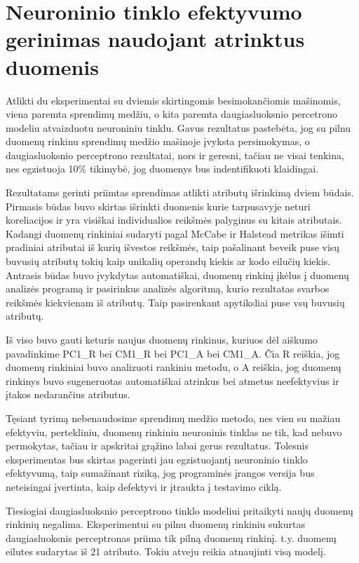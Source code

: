 \documentclass{VUMIFPSbakalaurinis}
\begin{document}
\section{Neuroninio tinklo efektyvumo gerinimas naudojant atrinktus duomenis}

Atlikti du eksperimentai su dviemis skirtingomis besimokančiomis mašinomis, viena paremta sprendimų medžiu, o kita paremta daugiasluoksnio percetrono modeliu atvaizduotu neuroniniu tinklu. Gavus rezultatus pastebėta, jog su pilnu duomenų rinkinu sprendimų medžio mašinoje įvyksta persimokymas, o daugiasluoksnio perceptrono rezultatai, nors ir geresni, tačiau ne visai tenkina, nes egzistuoja 10\% tikimybė, jog duomenys bus indentifikuoti klaidingai.

Rezultatams gerinti priimtas sprendimas atlikti atributų išrinkimą dviem būdais. Pirmasis būdas buvo skirtas išrinkti duomenis kurie tarpusavyje neturi koreliacijos ir yra visiškai individualios reikšmės palyginus su kitais atributais. Kadangi duomenų rinkiniai sudaryti pagal McCabe ir Halstead metrikas išimti pradiniai atributai iš kurių išvestos reikšmės, taip pašalinant beveik puse visų buvusių atributų tokių kaip unikalių operandų kiekis ar kodo eilučių kiekis. Antrasis būdas buvo įvykdytas automatiškai, duomenų rinkinį įkėlus į duomenų analizės programą ir pasirinkus analizės algoritmą, kurio rezultatas svarbos reikšmės kiekvienam iš atributų. Taip pasirenkant apytiksliai puse vsų buvusių atributų.

Iš viso buvo gauti keturis naujus duomenų rinkinus, kuriuos dėl aiškumo pavadinkime PC1\_R bei CM1\_R bei PC1\_A bei CM1\_A. Čia R reiškia, jog duomenų rinkiniai buvo analizuoti rankiniu metodu, o A reiškia, jog duomenų rinkinys buvo sugeneruotas automatiškai atrinkus bei atmetus neefektyvius ir įtakos nedarančius atributus.

Tęsiant tyrimą nebenaudosime sprendimų medžio metodo, nes vien su mažiau efektyviu, pertekliniu, duomenų rinkiniu neuroninis tinklas ne tik, kad nebuvo permokytas, tačiau ir apskritai grąžino labai gerus rezultatus. Tolesnis eksperimentas bus skirtas pagerinti jau egzistuojantį neuroninio tinklo efektyvumą, taip sumažinant riziką, jog programinės įrangos versija bus neteisingai įvertinta, kaip defektyvi ir įtraukta į testavimo ciklą.

Tiesiogiai daugiasluoksnio perceptrono tinklo modeliui pritaikyti naujų duomenų rinkinių negalima. Eksperimentui su pilnu duomenų rinkiniu sukurtas daugiasluoksnis perceptronas priima tik pilną duomenų rinkinį. t.y. duomenų eilutes sudarytas iš 21 atributo. Tokiu atveju reikia atnaujinti visą modelį.
\end{document}
